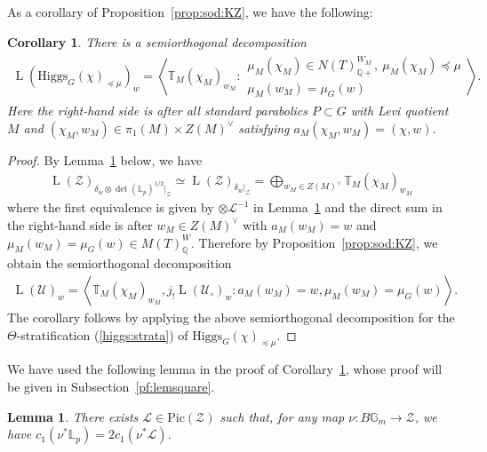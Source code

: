 \documentclass [11pt,oneside,a4paper,mathscr]{amsart}
\newtheorem{cor}[thm]{Corollary}
\newtheorem{lemma}[thm]{Lemma}
\theoremstyle{definition}
\newcommand{\zZ}{\mathcal{Z}}
\newcommand{\U}{\mathcal{U}}
\newcommand{\LL}{\operatorname{L}}
\newcommand{\bgm}{B\mathbb{G}_m}
\newcommand{\Hig}{\mathrm{Higgs}}
\begin{document}
As a corollary of Proposition~\ref{prop:sod:KZ}, we have the following:  
\begin{cor}\label{cor:higgsc}
	There is a semiorthogonal decomposition 
\begin{align*}
    \LL(\Hig_G(\chi)_{\preceq \mu})_w=\left\langle \mathbb{T}_{M}(\chi_{M})_{w_{M}} : 
     \begin{array}{ll}\mu_M(\chi_{M})\in N(T)_{\mathbb{Q}+}^{W_M}, \ \mu_M(\chi_M)\preceq \mu \\ \mu_M(w_M)=\mu_G(w)
     \end{array}
    \right\rangle. 
\end{align*}
    Here the right-hand side is after all standard parabolics $P\subset G$ with Levi quotient 
    $M$ and $(\chi_{M}, w_{M}) \in \pi_1(M) \times Z(M)^{\vee}$ satisfying $a_{M}(\chi_{M}, w_{M})=(\chi, w)$.
	\end{cor}
\begin{proof}
	By Lemma~\ref{lem:square} below, we have 
	\begin{align*}
		\LL(\zZ)_{\delta_w\otimes \det(\mathbb{L}_p)^{1/2}|_{\zZ}}
		\simeq \LL(\zZ)_{\delta_w|_{\zZ}} =\bigoplus_{w_M \in Z(M)^{\vee}}\mathbb{T}_M(\chi_M)_{w_M}
		\end{align*}
        where the first equivalence is given by $\otimes \mathcal{L}^{-1}$ in Lemma~\ref{lem:square} and 
        the direct sum in the right-hand side is after $w_M \in Z(M)^{\vee}$ with $a_M(w_M)=w$ and $\mu_M(w_M)=\mu_G(w) \in M(T)_{\mathbb{Q}}^W$. 
	Therefore by Proposition~\ref{prop:sod:KZ}, 
    we obtain the semiorthogonal decomposition 
	\begin{align*}
		\LL(\U)_{w}=\left\langle 
        \mathbb{T}_M(\chi_M)_{w_M},
		j_{!}\LL(\U_{\circ})_w  : a_M(w_M)=w, \mu_M(w_M)=\mu_G(w)\right\rangle. 
		\end{align*}
	The corollary follows by applying the above semiorthogonal decomposition 
	for the $\Theta$-stratification (\ref{higgs:strata}) of 
	$\Hig_G(\chi)_{\preceq \mu}$. 	
	\end{proof}

    We have used the following lemma in the proof of Corollary~\ref{cor:higgsc}, whose
    proof will be given in Subsection~\ref{pf:lemsquare}.
\begin{lemma}\label{lem:square}
There exists $\mathcal{L} \in \mathrm{Pic}(\zZ)$ such that, 
for any map $\nu \colon \bgm \to \zZ$, we have 
$c_1(\nu^*\mathbb{L}_p)=2c_1(\nu^*\mathcal{L})$. 
	\end{lemma}
\end{document}
